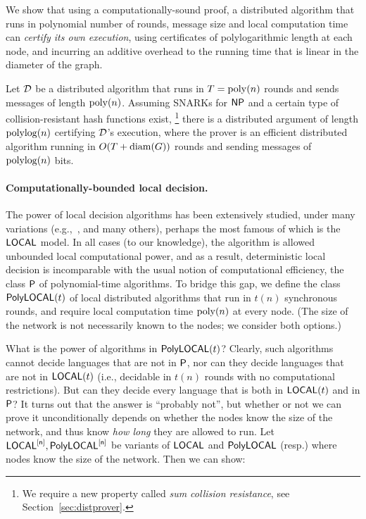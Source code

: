 	We show that using a computationally-sound proof,
	a distributed algorithm that runs in polynomial number of rounds, message size
	and local computation time can \emph{certify its own execution}, using certificates of polylogarithmic length
	at each node, and incurring an additive overhead to the running time that 
	is linear in the diameter of the graph.
	

\begin{theorem}
    Let $\mathcal{D}$ be a distributed algorithm that runs in $T = \operatorname{poly}(n)$ rounds
    and sends messages of length $\operatorname{poly}(n)$.
    Assuming SNARKs for ${\mathsf{NP}}$ %
    and %
    a certain type of collision-resistant hash functions exist,%
    \footnote{We require a new property called \emph{sum collision resistance}, see Section~\ref{sec:distprover}.}
    there is a distributed argument of length $\operatorname{polylog}(n)$
    certifying $\mathcal{D}$'s execution, where the prover is an efficient distributed algorithm
    running in $O(T + \operatorname{diam}(G))$ rounds and sending messages of $\operatorname{polylog}(n)$ bits.
    \label{thm:distprover_informal}
\end{theorem}

\paragraph{Computationally-bounded local decision.}
The power of local decision algorithms has been extensively studied, under many variations (e.g.,~\cite{NS95,fraigniaud2013can,fraigniaud2013towards}, and many others),
perhaps the most famous of which is the ${\mathsf{LOCAL}}$ model.
In all cases (to our knowledge), the algorithm is allowed unbounded local computational power, and as a result,
deterministic local decision is incomparable with the usual notion of computational efficiency, the class ${\mathsf{P}}$
of polynomial-time algorithms.
To bridge this gap, we define the class $\mathsf{PolyLOCAL}(t)$ of local distributed algorithms that run in 
$t(n)$ synchronous rounds, and require local computation time $\operatorname{poly}(n)$ at every node.
(The size of the network is not necessarily known to the nodes;
we consider both options.)

What is the power of algorithms in $\mathsf{PolyLOCAL}(t)$?
Clearly, such algorithms cannot decide languages that are not in ${\mathsf{P}}$, nor can they decide languages 
that are not in ${\mathsf{LOCAL}}(t)$ (i.e., decidable in $t(n)$ rounds with no computational restrictions).
But can they decide every language that is both in ${\mathsf{LOCAL}}(t)$ and in ${\mathsf{P}}$?
It turns out that the answer is ``probably not'', 
but whether or not we can prove it unconditionally depends on whether the nodes know the size of the network,
and thus know \emph{how long} they are allowed to run.
Let ${\mathsf{LOCAL}}^{[\mathsf{n}]}, \mathsf{PolyLOCAL}^{[\mathsf{n}]}$ be variants of ${\mathsf{LOCAL}}$ and $\mathsf{PolyLOCAL}$ (resp.) where nodes know the size of the network.
Then we can show:


